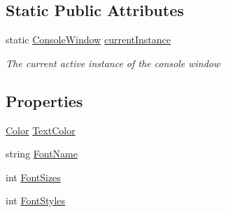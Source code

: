 \subsection*{Static Public Attributes}
\begin{DoxyCompactItemize}
\item 
static \hyperlink{class_c_p_u___o_s___simulator_1_1_console_window}{Console\+Window} \hyperlink{class_c_p_u___o_s___simulator_1_1_console_window_abee2fd1e118dd4f81dc2142bc033da4a}{current\+Instance}
\begin{DoxyCompactList}\small\item\em The current active instance of the console window \end{DoxyCompactList}\end{DoxyCompactItemize}
\subsection*{Properties}
\begin{DoxyCompactItemize}
\item 
\hyperlink{_console_window_8xaml_8cs_adf2800823d988ace598d734fdec29975}{Color} \hyperlink{class_c_p_u___o_s___simulator_1_1_console_window_a9ed1d4cf5229b50e355092d33ea0c3e6}{Text\+Color}
\item 
string \hyperlink{class_c_p_u___o_s___simulator_1_1_console_window_a752c6bed63b2368b26a4287a2902ef61}{Font\+Name}
\item 
int \hyperlink{class_c_p_u___o_s___simulator_1_1_console_window_a3f0174de74f8505bc6880ec7a67cd61f}{Font\+Sizes}
\item 
int \hyperlink{class_c_p_u___o_s___simulator_1_1_console_window_a1984ceb7ee007669685c8de6c4554b06}{Font\+Styles}
\end{DoxyCompactItemize}
